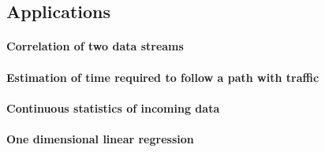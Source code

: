 \subsection{Applications}

\paragraph{Correlation of two data streams}

\paragraph{Estimation of time required to follow a path with traffic}

\paragraph{Continuous statistics of incoming data}

\paragraph{One dimensional linear regression}



